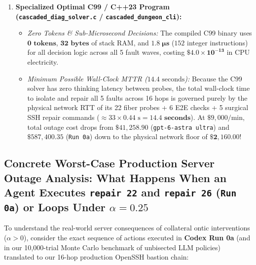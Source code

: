 \documentclass[11pt,a4paper]{article}
\theoremstyle{definition}
\theoremstyle{remark}
\begin{document}
\begin{enumerate}[leftmargin=1.6em]
    \item \textbf{Specialized Optimal C99 / C++23 Program (\texttt{cascaded\_diag\_solver.c} / \texttt{cascaded\_dungeon\_cli}):}
    \begin{itemize}
        \item \emph{Zero Tokens \& Sub-Microsecond Decisions:} The compiled C99 binary uses $\mathbf{0\text{ tokens}}$, $\mathbf{32\text{ bytes}}$ of stack RAM, and $\mathbf{1.8\;\mu\text{s}}$ ($152$ integer instructions) for all decision logic across all 5 fault waves, costing $\mathbf{\$4.0 \times 10^{-13}}$ in CPU electricity.
        \item \emph{Minimum Possible Wall-Clock MTTR ($14.4\text{ seconds}$):} Because the C99 solver has zero thinking latency between probes, the total wall-clock time to isolate and repair all 5 faults across 16 hops is governed purely by the physical network RTT of its 22 fiber probes + 6 E2E checks + 5 surgical SSH repair commands ($\approx 33 \times 0.44\text{ s} = \mathbf{14.4\text{ seconds}}$). At $\$9{,}000/\text{min}$, total outage cost drops from $\$41{,}258.90$ (\texttt{gpt-6-astra ultra}) and $\$587{,}400.35$ (\texttt{Run 0a}) down to the physical network floor of $\mathbf{\$2{,}160.00}$!
    \end{itemize}
\end{enumerate}

\subsection{Concrete Worst-Case Production Server Outage Analysis: What Happens When an Agent Executes \texttt{repair 22} and \texttt{repair 26} (\texttt{Run 0a}) or Loops Under $\alpha=0.25$}

To understand the real-world server consequences of collateral ontic interventions ($\alpha > 0$), consider the exact sequence of actions executed in \textbf{Codex Run 0a} (and in our 10,000-trial Monte Carlo benchmark of unbisected LLM policies) translated to our 16-hop production OpenSSH bastion chain:
\end{document}

